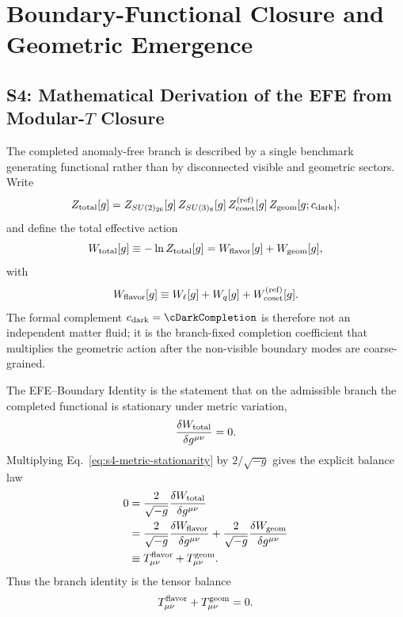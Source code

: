 \documentclass[11pt]{article}
\begin{document}
\section{Boundary-Functional Closure and Geometric Emergence}

\subsection*{S4: Mathematical Derivation of the EFE from Modular-$T$ Closure}
\label{supp-sec:s4-efe-boundary-identity}

The completed anomaly-free branch is described by a single benchmark generating
functional rather than by disconnected visible and geometric sectors. Write
\begin{equation}
 Z_{\rm total}[g]
 =
 Z_{SU(2)_{26}}[g]\,Z_{SU(3)_8}[g]\,Z_{\rm coset}^{\rm(ref)}[g]\,Z_{\rm geom}[g;c_{\rm dark}],
\end{equation}
and define the total effective action
\begin{equation}
 W_{\rm total}[g]
 \equiv
 -\ln Z_{\rm total}[g]
 =
 W_{\rm flavor}[g]+W_{\rm geom}[g],
\end{equation}
with
\begin{equation}
 W_{\rm flavor}[g]
 \equiv
 W_{\ell}[g]+W_q[g]+W_{\rm coset}^{\rm(ref)}[g].
\end{equation}
The formal complement $c_{\rm dark}=\cDarkCompletion$ is therefore not an
independent matter fluid; it is the branch-fixed completion coefficient that
multiplies the geometric action after the non-visible boundary modes are
coarse-grained.

The EFE--Boundary Identity is the statement that on the admissible branch the
completed functional is stationary under metric variation,
\begin{equation}
\label{eq:s4-metric-stationarity}
 \frac{\delta W_{\rm total}}{\delta g^{\mu\nu}}=0.
\end{equation}
Multiplying Eq.~\eqref{eq:s4-metric-stationarity} by $2/\sqrt{-g}$ gives the
explicit balance law
\begin{align}
 0
 &=
 \frac{2}{\sqrt{-g}}\frac{\delta W_{\rm total}}{\delta g^{\mu\nu}} \nonumber\\
 &=
 \frac{2}{\sqrt{-g}}\frac{\delta W_{\rm flavor}}{\delta g^{\mu\nu}}
 +
 \frac{2}{\sqrt{-g}}\frac{\delta W_{\rm geom}}{\delta g^{\mu\nu}} \nonumber\\
 &\equiv
 T_{\mu\nu}^{\rm flavor}+T_{\mu\nu}^{\rm geom}.
\label{eq:s4-balance-law}
\end{align}
Thus the branch identity is the tensor balance
\begin{equation}
\label{eq:s4-flavor-geom-balance}
 T_{\mu\nu}^{\rm flavor}+T_{\mu\nu}^{\rm geom}=0.
\end{equation}
\end{document}
